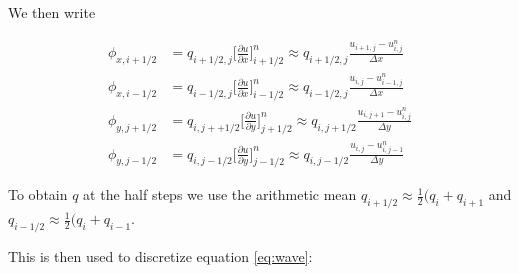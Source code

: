 \documentclass[10pt, a4paper]{amsart}
\numberwithin{figure}{section}
\numberwithin{table}{section}
\begin{document}
We then write

\begin{align}
    \phi_{x,i+1/2} & = q_{i+1/2,j} \big[\frac{\partial u}{\partial
    x}\big]_{i+1/2}^n \approx q_{i+1/2,j} \frac{u_{i+1,j} - u_{i,j}^n}{\Delta
    x}\\
    \phi_{x,i-1/2} & = q_{i-1/2,j} \big[\frac{\partial u}{\partial
    x}\big]_{i-1/2}^n \approx q_{i-1/2,j} \frac{u_{i,j} - u_{i-1,j}^n}{\Delta
    x}\\
    \phi_{y,j+1/2} & = q_{i,j++1/2} \big[\frac{\partial u}{\partial
    y}\big]_{j+1/2}^n \approx q_{i,j+1/2} \frac{u_{i,j+1} - u_{i,j}^n}{\Delta
    y}\\
    \phi_{y,j-1/2} & = q_{i,j-1/2} \big[\frac{\partial u}{\partial
    y}\big]_{j-1/2}^n \approx q_{i,j-1/2} \frac{u_{i,j} - u_{i,j-1}^n}{\Delta
    y}
\end{align}


To obtain $q$ at the half steps we use the arithmetic mean $q_{i+1/2} \approx
\frac{1}{2}(q_i + q_{i+1}$ and $q_{i-1/2} \approx \frac{1}{2}(q_i + q_{i-1}$.

This is then used to discretize equation \ref{eq:wave}:
\end{document}
